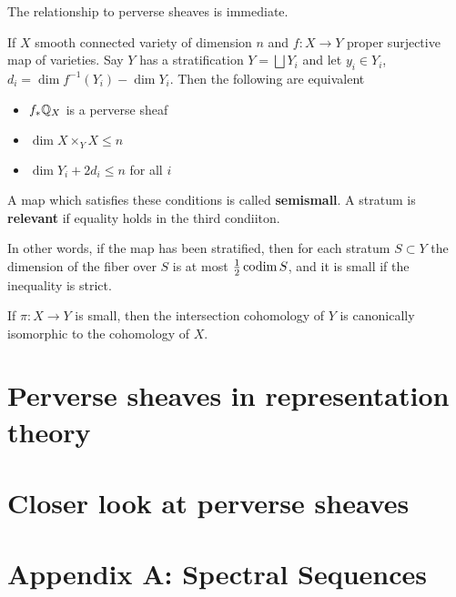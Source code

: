 \documentclass[12pt]{article}
\begin{document}
The relationship to perverse sheaves is immediate. \begin{proposition}
    If $X$ smooth connected variety of dimension $n$ and 
    $f:X\to Y$ proper surjective map of varieties. Say $Y$ has
    a stratification $Y = \bigsqcup Y_i$ and let $y_i\in Y_i$, $d_i = 
    \dim f^{-1}(Y_i) - \dim Y_i$. Then the following are equivalent \begin{itemize}
        \item $f_*\mathbb{Q}_X$ is a perverse sheaf
        \item $\dim X \times_Y X \leq n$
        \item $\dim Y_i + 2d_i \leq n$ for all $i$
    \end{itemize}
A map which satisfies these conditions is called \textbf{semismall}.
A stratum is \textbf{relevant} if equality holds in the third condiiton.
\end{proposition}
In other words, if the map has been stratified, then for each stratum $S\subset Y$ the dimension of 
the fiber over $S$ is at most $\frac{1}{2} \operatorname{codim} S$, and it is small 
if the inequality is strict.

\begin{proposition}
    If $\pi:X\to Y$ is small, then the intersection 
    cohomology of $Y$ is canonically isomorphic to the
    cohomology of $X$.
\end{proposition}

\section{Perverse sheaves in representation theory}

\section{Closer look at perverse sheaves}


\section{Appendix A: Spectral Sequences}


{}

\end{document}
